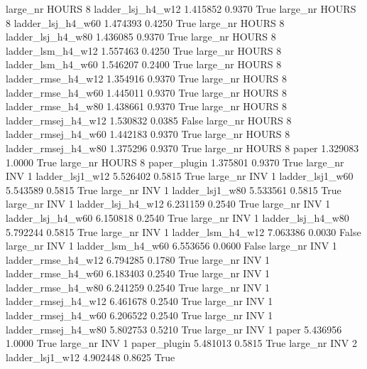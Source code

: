   large_nr    HOURS                 8   ladder_lsj_h4_w12   1.415852      0.9370    True
  large_nr    HOURS                 8   ladder_lsj_h4_w60   1.474393      0.4250    True
  large_nr    HOURS                 8   ladder_lsj_h4_w80   1.436085      0.9370    True
  large_nr    HOURS                 8   ladder_lsm_h4_w12   1.557463      0.4250    True
  large_nr    HOURS                 8   ladder_lsm_h4_w60   1.546207      0.2400    True
  large_nr    HOURS                 8  ladder_rmse_h4_w12   1.354916      0.9370    True
  large_nr    HOURS                 8  ladder_rmse_h4_w60   1.445011      0.9370    True
  large_nr    HOURS                 8  ladder_rmse_h4_w80   1.438661      0.9370    True
  large_nr    HOURS                 8 ladder_rmsej_h4_w12   1.530832      0.0385   False
  large_nr    HOURS                 8 ladder_rmsej_h4_w60   1.442183      0.9370    True
  large_nr    HOURS                 8 ladder_rmsej_h4_w80   1.375296      0.9370    True
  large_nr    HOURS                 8               paper   1.329083      1.0000    True
  large_nr    HOURS                 8        paper_plugin   1.375801      0.9370    True
  large_nr      INV                 1     ladder_lsj1_w12   5.526402      0.5815    True
  large_nr      INV                 1     ladder_lsj1_w60   5.543589      0.5815    True
  large_nr      INV                 1     ladder_lsj1_w80   5.533561      0.5815    True
  large_nr      INV                 1   ladder_lsj_h4_w12   6.231159      0.2540    True
  large_nr      INV                 1   ladder_lsj_h4_w60   6.150818      0.2540    True
  large_nr      INV                 1   ladder_lsj_h4_w80   5.792244      0.5815    True
  large_nr      INV                 1   ladder_lsm_h4_w12   7.063386      0.0030   False
  large_nr      INV                 1   ladder_lsm_h4_w60   6.553656      0.0600   False
  large_nr      INV                 1  ladder_rmse_h4_w12   6.794285      0.1780    True
  large_nr      INV                 1  ladder_rmse_h4_w60   6.183403      0.2540    True
  large_nr      INV                 1  ladder_rmse_h4_w80   6.241259      0.2540    True
  large_nr      INV                 1 ladder_rmsej_h4_w12   6.461678      0.2540    True
  large_nr      INV                 1 ladder_rmsej_h4_w60   6.206522      0.2540    True
  large_nr      INV                 1 ladder_rmsej_h4_w80   5.802753      0.5210    True
  large_nr      INV                 1               paper   5.436956      1.0000    True
  large_nr      INV                 1        paper_plugin   5.481013      0.5815    True
  large_nr      INV                 2     ladder_lsj1_w12   4.902448      0.8625    True
